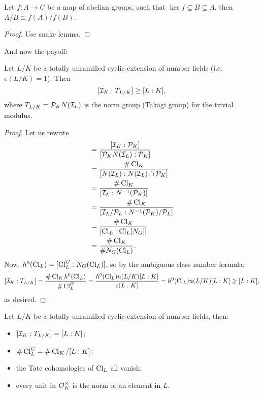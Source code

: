 \documentclass[11pt]{amsart}
\begin{document}
\begin{lem}
    Let $f:A\to C$ be a map of abelian groups, such that $\ker f\subseteq B\subseteq A$, then $A/B\cong f(A)/f(B)$.
\end{lem}

\begin{proof}
    Use snake lemma.
\end{proof}

And now the payoff:

\begin{thm}
\label{1stMainIneq}
    Let $L/K$ be a totally unramified cyclic extension of number fields (i.e. $e(L/K) = 1$). Then
    \[[\mathcal{I}_K : T_{L/K}] \ge [L:K],\]
    where $T_{L/K} = \mathcal{P}_K N(\mathcal{I}_L)$ is the norm group (Takagi group) for the trivial modulus.
\end{thm}

\begin{proof}
    Let us rewrite
    \begin{align*}
    [\cI_K:\cP_K N(\cI_L)]
    &= \frac{[\cI_K : \cP_K]}{[\cP_K N(\cI_L) : \cP_K]} \\
    &= \frac{\#\Cl_K}{[N(\cI_L) : N(\cI_L)\cap \cP_K]} \\
    &= \frac{\#\Cl_K}{[\cI_L : N^{-1}(\cP_K)]} \\
    &= \frac{\#\Cl_K}{[\cI_L/\cP_L : N^{-1}(\cP_K)/\cP_L]} \\
    &= \frac{\#\Cl_K}{[\Cl_L : \Cl_L[N_G]]} \\
    &= \frac{\#\Cl_K}{\# N_G(\Cl_L)}.
    \end{align*}
    Now, $h^0(\operatorname{Cl}_L) = [\operatorname{Cl}_L^G : N_G(\operatorname{Cl}_L)]$, so by the ambiguous class number formula:
    \[[\mathcal{I}_K : T_{L/K}] = \frac{\#\operatorname{Cl}_K h^0(\operatorname{Cl}_L)}{\#\operatorname{Cl}_L^G} = \frac{h^0(\operatorname{Cl}_L)n(L/K)[L:K]}{e(L:K)} = h^0(\operatorname{Cl}_L)n(L/K)[L:K] \ge [L:K],\]
    as desired.
\end{proof}

\begin{cor}
    Let $L/K$ be a totally unramified cyclic extension of number fields, then:
    \begin{itemize}
        \item $[\mathcal{I}_K:T_{L/K}] = [L:K]$;
        \item $\# \operatorname{Cl}_L^G = \# \operatorname{Cl}_K/[L:K]$;
        \item the Tate cohomologies of $\operatorname{Cl}_L$ all vanish;
        \item every unit in $\mathcal{O}_K^\times$ is the norm of an element in $L$.
    \end{itemize}
\end{cor}
\end{document}
